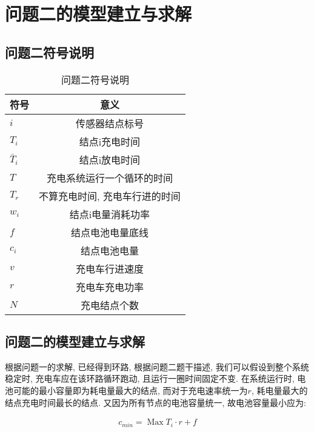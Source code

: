 
\newpage
\section{问题二的模型建立与求解}
\label{sec:method2}
\subsection{问题二符号说明}

\begin{table}[h]
	\begin{center}
		\caption{问题二符号说明}
		\begin{tabular}{l|c}
			\toprule[2pt] 
			    符号 & 意义 \\ \hline
			 $i$& 传感器结点标号\\
             $T_i$&结点i充电时间\\
             $\bar{T}_i$&结点i放电时间\\
             $T$&充电系统运行一个循环的时间\\
             $T_r$&不算充电时间, 充电车行进的时间\\
			 $w_i$&结点i电量消耗功率\\
			 $f$&结点电池电量底线\\
			 $c_i$&结点电池电量\\
			 $v$&充电车行进速度\\
             $r$&充电车充电功率\\
			 $N$&充电结点个数\\
			
			\toprule[2pt] 
		\end{tabular}
		
		\label{tab:distribution}
		\vspace{-0.4cm}
	\end{center}
\end{table}


\subsection{问题二的模型建立与求解}
根据问题一的求解, 已经得到环路, 根据问题二题干描述, 我们可以假设到整个系统稳定时, 充电车应在该环路循环跑动, 且运行一圈时间固定不变. 在系统运行时, 电池可能的最小容量即为耗电量最大的结点, 而对于充电速率统一为$r$, 耗电量最大的结点充电时间最长的结点. 又因为所有节点的电池容量统一, 故电池容量最小应为:

\begin{eqnarray}
    c_{min} = \mathop{Max} T_i \cdot r + f
    \label{eq:cmin}
\end{eqnarray}

